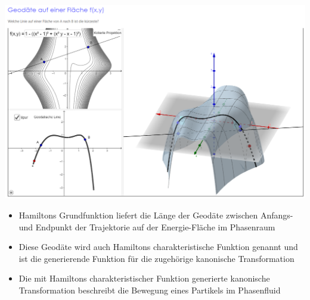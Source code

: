 \begin{frame}
  \vspace*{-0.75cm} \hspace*{-2.3cm} \includegraphics[scale=0.4]{images/geodaete}
\end{frame}

\begin{frame}
    \begin{itemize}
        \item Hamiltons Grundfunktion liefert die Länge der Geodäte zwischen Anfangs- und Endpunkt der Trajektorie auf der Energie-Fläche im Phasenraum
        \item Diese Geodäte wird auch Hamiltons charakteristische Funktion genannt und ist die generierende Funktion für die zugehörige kanonische Transformation
        \item Die mit Hamiltons charakteristischer Funktion generierte kanonische Transformation beschreibt die Bewegung eines Partikels im Phasenfluid
     \end{itemize}
\end{frame}